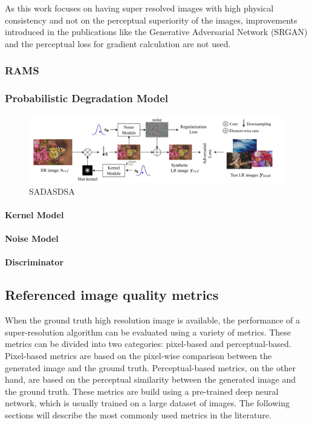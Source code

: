             As this work focuses on having super resolved images with high physical consistency and not on the perceptual superiority of the images, improvements introduced in the publications like the Generative Adversarial Network (SRGAN)  and the perceptual loss for gradient calculation are not used.
        

        \subsubsection{RAMS}
        \subsubsection{Probabilistic Degradation Model}

            \begin{figure}[h!]
                \centering
                \includegraphics[scale=0.38]{Includes/3-probabilistic-degradation-model.png}
                \caption{SADASDSA}
                \label{fig:3-probabilistic-degradation-model}
            \end{figure}


            \paragraph{Kernel Model}
            \paragraph{Noise Model}
            \paragraph{Discriminator}


    \subsection{Referenced image quality metrics}

    When the ground truth high resolution image is available, the performance of a super-resolution algorithm can be evaluated using a variety of metrics. 
    These metrics can be divided into two categories: pixel-based and perceptual-based.
    Pixel-based metrics are based on the pixel-wise comparison between the generated image and the ground truth. 
    Perceptual-based metrics, on the other hand, are based on the perceptual similarity between the generated image and the ground truth. 
    These metrics are build using a pre-trained deep neural network, which is usually trained on a large dataset of images.
    The following sections will describe the most commonly used metrics in the literature.

